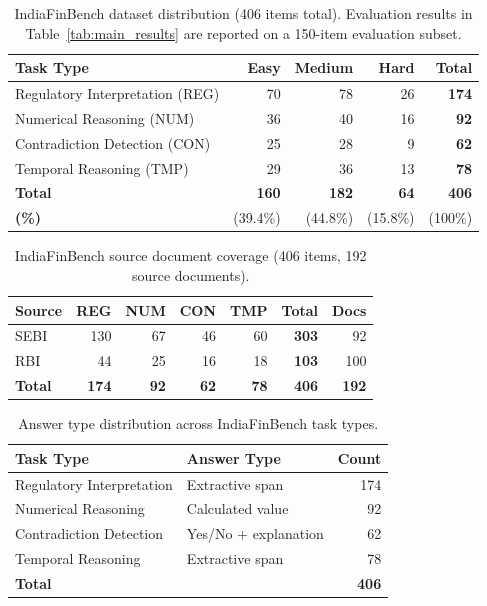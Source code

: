 
\begin{table}[h]
\centering
\caption{IndiaFinBench dataset distribution (406 items total). Evaluation results in Table~\ref{tab:main_results} are reported on a 150-item evaluation subset.}
\label{tab:dataset_distribution}
\begin{tabular}{lrrrr}
\toprule
\textbf{Task Type} & \textbf{Easy} & \textbf{Medium} & \textbf{Hard} & \textbf{Total} \\
\midrule
Regulatory Interpretation (REG) & 70  & 78  & 26  & \textbf{174} \\
Numerical Reasoning (NUM)       & 36  & 40  & 16  & \textbf{92}  \\
Contradiction Detection (CON)   & 25  & 28  & 9   & \textbf{62}  \\
Temporal Reasoning (TMP)        & 29  & 36  & 13  & \textbf{78}  \\
\midrule
\textbf{Total}                  & \textbf{160} & \textbf{182} & \textbf{64} & \textbf{406} \\
\textbf{(\%)}                   & (39.4\%) & (44.8\%) & (15.8\%) & (100\%) \\
\bottomrule
\end{tabular}
\end{table}

\begin{table}[h]
\centering
\caption{IndiaFinBench source document coverage (406 items, 192 source documents).}
\label{tab:source_breakdown}
\begin{tabular}{lrrrrrr}
\toprule
\textbf{Source} & \textbf{REG} & \textbf{NUM} & \textbf{CON} & \textbf{TMP} & \textbf{Total} & \textbf{Docs} \\
\midrule
SEBI & 130 & 67 & 46 & 60 & \textbf{303} & 92 \\
RBI  & 44  & 25 & 16 & 18 & \textbf{103} & 100 \\
\midrule
\textbf{Total} & \textbf{174} & \textbf{92} & \textbf{62} & \textbf{78} & \textbf{406} & \textbf{192} \\
\bottomrule
\end{tabular}
\end{table}

\begin{table}[h]
\centering
\caption{Answer type distribution across IndiaFinBench task types.}
\label{tab:answer_types}
\begin{tabular}{llr}
\toprule
\textbf{Task Type} & \textbf{Answer Type} & \textbf{Count} \\
\midrule
Regulatory Interpretation & Extractive span & 174 \\
Numerical Reasoning & Calculated value & 92 \\
Contradiction Detection & Yes/No + explanation & 62 \\
Temporal Reasoning & Extractive span & 78 \\
\midrule
\textbf{Total} & & \textbf{406} \\
\bottomrule
\end{tabular}
\end{table}
